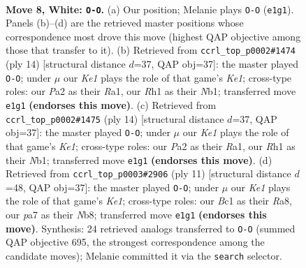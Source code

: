 \documentclass[11pt]{article}
\begin{document}
\begin{figure}[p]\centering
\begin{subfigure}{0.46\textwidth}\centering
\resizebox{\linewidth}{!}{%
\newchessgame
\chessboard[
  setfen={rnbqk2r/pp2ppbp/1n1p2p1/8/3P4/1B3N2/PPP2PPP/RNBQK2R w KQkq - 0 8},
  showmover=false,
  pgfstyle=straightmove, color=movearrow, markmove={e1-g1}
]}
\caption{}
\end{subfigure}\hfill
\begin{subfigure}{0.46\textwidth}\centering
\resizebox{\linewidth}{!}{%
\newchessgame
\chessboard[
  setfen={rnbqk2r/pp2ppbp/1n1p2p1/8/2PP4/5N2/PP2BPPP/RNBQK2R w KQkq - 0 8},
  showmover=false,
  pgfstyle=straightmove, color=movearrow, markmove={e1-g1}
]}
\caption{}
\end{subfigure}
\\[4pt]
\begin{subfigure}{0.46\textwidth}\centering
\resizebox{\linewidth}{!}{%
\newchessgame
\chessboard[
  setfen={rnbqk2r/pp2ppbp/1n1p2p1/8/2PP4/5N2/PP2BPPP/RNBQK2R w KQkq - 0 8},
  showmover=false,
  pgfstyle=straightmove, color=movearrow, markmove={e1-g1}
]}
\caption{}
\end{subfigure}\hfill
\begin{subfigure}{0.46\textwidth}\centering
\resizebox{\linewidth}{!}{%
\newchessgame
\chessboard[
  setfen={rnbqk2r/ppp2ppp/3b1n2/3p4/3P4/3B1N2/PPP2PPP/RNBQ1RK1 b kq - 5 6},
  showmover=false,
  pgfstyle=straightmove, color=movearrow, markmove={e8-g8}
]}
\caption{}
\end{subfigure}
\caption{\textbf{Move 8, White: \texttt{O-O}.} (a) Our position; Melanie plays \texttt{O-O} (\texttt{e1g1}). Panels (b)--(d) are the retrieved master positions whose correspondence most drove this move (highest QAP objective among those that transfer to it). (b) Retrieved from \texttt{ccrl\_top\_p0002\#1474} (ply 14) [structural distance $d$=37, QAP obj=37]: the master played \texttt{O-O}; under $\mu$ our \emph{Ke1} plays the role of that game's \emph{Ke1}; cross-type roles: our \emph{P}a2 as their \emph{R}a1, our \emph{R}h1 as their \emph{N}b1; transferred move \texttt{e1g1} \textbf{(endorses this move)}. (c) Retrieved from \texttt{ccrl\_top\_p0002\#1475} (ply 14) [structural distance $d$=37, QAP obj=37]: the master played \texttt{O-O}; under $\mu$ our \emph{Ke1} plays the role of that game's \emph{Ke1}; cross-type roles: our \emph{P}a2 as their \emph{R}a1, our \emph{R}h1 as their \emph{N}b1; transferred move \texttt{e1g1} \textbf{(endorses this move)}. (d) Retrieved from \texttt{ccrl\_top\_p0003\#2906} (ply 11) [structural distance $d$=48, QAP obj=37]: the master played \texttt{O-O}; under $\mu$ our \emph{Ke1} plays the role of that game's \emph{Ke1}; cross-type roles: our \emph{B}c1 as their \emph{R}a8, our \emph{p}a7 as their \emph{N}b8; transferred move \texttt{e1g1} \textbf{(endorses this move)}. Synthesis: 24 retrieved analogs transferred to \texttt{O-O} (summed QAP objective 695, the strongest correspondence among the candidate moves); Melanie committed it via the \texttt{search} selector.}
\label{fig:thought-m14}
\end{figure}
\end{document}
